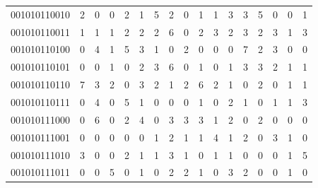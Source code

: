 \documentclass[10pt,a4paper]{article}
\begin{document}
\begin{longtable}{ |c|c|c|c|c|c|c|c|c|c|c|c|c|c|c|c|c| }
    001010110010              & 2                            & 0                                & 0                            & 2                              & 1   & 5   & 2   & 0   & 1   & 1   & 3   & 3   & 5   & 0   & 0   & 1   \\
    001010110011              & 1                            & 1                                & 1                            & 2                              & 2   & 2   & 6   & 0   & 2   & 3   & 2   & 3   & 2   & 3   & 1   & 3   \\
    001010110100              & 0                            & 4                                & 1                            & 5                              & 3   & 1   & 0   & 2   & 0   & 0   & 0   & 7   & 2   & 3   & 0   & 0   \\
    001010110101              & 0                            & 0                                & 1                            & 0                              & 2   & 3   & 6   & 0   & 1   & 0   & 1   & 3   & 3   & 2   & 1   & 1   \\
    001010110110              & 7                            & 3                                & 2                            & 0                              & 3   & 2   & 1   & 2   & 6   & 2   & 1   & 0   & 2   & 0   & 1   & 1   \\
    001010110111              & 0                            & 4                                & 0                            & 5                              & 1   & 0   & 0   & 0   & 1   & 0   & 2   & 1   & 0   & 1   & 1   & 3   \\
    001010111000              & 0                            & 6                                & 0                            & 2                              & 4   & 0   & 3   & 3   & 3   & 1   & 2   & 0   & 2   & 0   & 0   & 0   \\
    001010111001              & 0                            & 0                                & 0                            & 0                              & 0   & 1   & 2   & 1   & 1   & 4   & 1   & 2   & 0   & 3   & 1   & 0   \\
    001010111010              & 3                            & 0                                & 0                            & 2                              & 1   & 1   & 3   & 1   & 0   & 1   & 1   & 0   & 0   & 0   & 1   & 5   \\
    001010111011              & 0                            & 0                                & 5                            & 0                              & 1   & 0   & 2   & 2   & 1   & 0   & 3   & 2   & 0   & 0   & 1   & 0   \\

\end{longtable}
\end{document}
